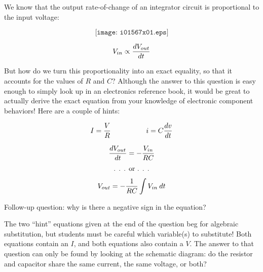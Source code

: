 

We know that the output rate-of-change of an integrator circuit is proportional to the input voltage:

$$\texttt{[image: i01567x01.eps]}$$

$$V_{in} \propto {dV_{out} \over dt}$$

But how do we turn this proportionality into an exact equality, so that it accounts for the values of $R$ and $C$?  Although the answer to this question is easy enough to simply look up in an electronics reference book, it would be great to actually derive the exact equation from your knowledge of electronic component behaviors!  Here are a couple of hints:

$$I = {V \over R} \hbox{\hskip 50pt} i = C {dv \over dt}$$







$${dV_{out} \over dt} = - {V_{in} \over RC}$$

$$\hbox{. . . or . . .}$$

$$V_{out} = - {1 \over RC} \int V_{in} \> dt$$

\vskip 10pt

Follow-up question: why is there a negative sign in the equation?







The two ``hint'' equations given at the end of the question beg for algebraic substitution, but students must be careful which variable(s) to substitute!  Both equations contain an $I$, and both equations also contain a $V$.  The answer to that question can only be found by looking at the schematic diagram: do the resistor and capacitor share the same current, the same voltage, or both?




